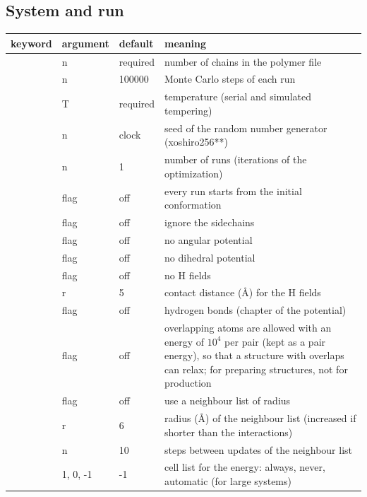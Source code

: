 \documentclass[11pt,a4paper]{article}
\newenvironment{keywords}
 {\begin{longtable}{>{\raggedright}p{0.2\textwidth}>{\raggedright}p{0.12\textwidth}>{\raggedright}p{0.14\textwidth}p{0.41\textwidth}}
  \toprule keyword & argument & default & meaning \\ \midrule \endhead
  \bottomrule \endfoot}
 {\end{longtable}}
\newcommand{\key}[4]{\kw{#1} & #2 & #3 & #4 \\}
\begin{document}
\subsection{System and run}
\begin{keywords}
\key{nchains}{n}{required}{number of chains in the polymer file}
\key{nstep}{n}{100000}{Monte Carlo steps of each run}
\key{Temp}{T}{required}{temperature (serial and simulated tempering)}
\key{seed}{n}{clock}{seed of the random number generator (xoshiro256**)}
\key{nrun}{n}{1}{number of runs (iterations of the optimization)}
\key{always_restart}{flag}{off}{every run starts from the initial conformation}
\key{nosidechain}{flag}{off}{ignore the sidechains}
\key{noangpot}{flag}{off}{no angular potential}
\key{nodihpot}{flag}{off}{no dihedral potential}
\key{nohfields}{flag}{off}{no H fields}
\key{r_contact}{r}{5}{contact distance (\AA) for the H fields}
\key{hb}{flag}{off}{hydrogen bonds (chapter \kw{[ hydrogen_bonds ]} of the potential)}
\key{disentangle}{flag}{off}{overlapping atoms are allowed with an energy of $10^4$ per pair (kept as a pair energy), so that a structure with overlaps can relax; for preparing structures, not for production}
\key{shell}{flag}{off}{use a neighbour list of radius \kw{r2shell}}
\key{r2shell}{r}{6}{radius (\AA) of the neighbour list (increased if shorter than the interactions)}
\key{nshell}{n}{10}{steps between updates of the neighbour list}
\key{cells}{1, 0, -1}{-1}{cell list for the energy: always, never, automatic (for large systems)}
\end{keywords}
\end{document}
